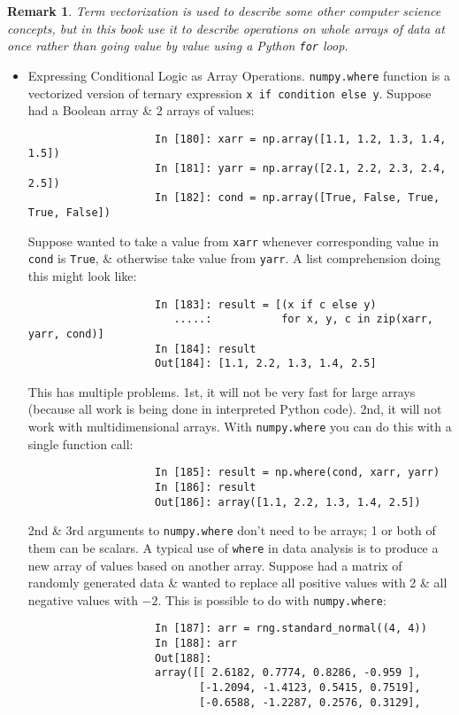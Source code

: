 \documentclass{article}
\newtheorem{remark}{Remark}
\begin{document}
\begin{enumerate}
\begin{itemize}
\begin{itemize}
			\begin{remark}
				Term \emph{vectorization} is used to describe some other computer science concepts, but in this book use it to describe operations on whole arrays of data at once rather than going value by value using a Python {\tt for} loop.
			\end{remark}
			\begin{itemize}
				\item {\sf Expressing Conditional Logic as Array Operations.} {\tt numpy.where} function is a vectorized version of ternary expression {\tt x if condition else y}. Suppose had a Boolean array \& 2 arrays of values:
				\begin{verbatim}
					In [180]: xarr = np.array([1.1, 1.2, 1.3, 1.4, 1.5])
					In [181]: yarr = np.array([2.1, 2.2, 2.3, 2.4, 2.5])
					In [182]: cond = np.array([True, False, True, True, False])
				\end{verbatim}
				Suppose wanted to take a value from {\tt xarr} whenever corresponding value in {\tt cond} is {\tt True}, \& otherwise take value from {\tt yarr}. A list comprehension doing this might look like:
				\begin{verbatim}
					In [183]: result = [(x if c else y)
					   .....:           for x, y, c in zip(xarr, yarr, cond)]
					In [184]: result
					Out[184]: [1.1, 2.2, 1.3, 1.4, 2.5]
				\end{verbatim}
				This has multiple problems. 1st, it will not be very fast for large arrays (because all work is being done in interpreted Python code). 2nd, it will not work with multidimensional arrays. With {\tt numpy.where} you can do this with a single function call:
				\begin{verbatim}
					In [185]: result = np.where(cond, xarr, yarr)
					In [186]: result
					Out[186]: array([1.1, 2.2, 1.3, 1.4, 2.5])
				\end{verbatim}
				2nd \& 3rd arguments to {\tt numpy.where} don't need to be arrays; 1 or both of them can be scalars. A typical use of {\tt where} in data analysis is to produce a new array of values based on another array. Suppose had a matrix of randomly generated data \& wanted to replace all positive values with 2 \& all negative values with $-2$. This is possible to do with {\tt numpy.where}:
				\begin{verbatim}
					In [187]: arr = rng.standard_normal((4, 4))
					In [188]: arr
					Out[188]:
					array([[ 2.6182, 0.7774, 0.8286, -0.959 ],
					       [-1.2094, -1.4123, 0.5415, 0.7519],
					       [-0.6588, -1.2287, 0.2576, 0.3129],

\end{verbatim}
\end{itemize}
\end{itemize}
\end{itemize}
\end{enumerate}
\end{document}
